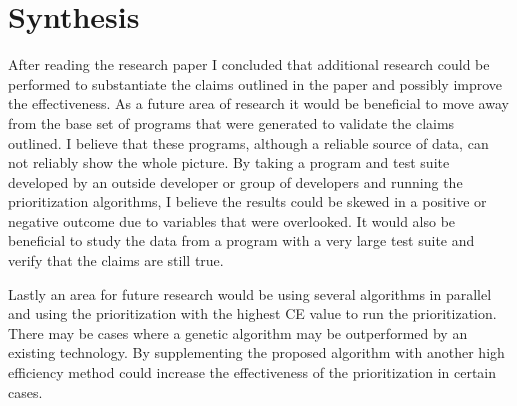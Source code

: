 \documentclass[11pt]{article}
\begin{document}
\vspace*{-.1in}
\section{Synthesis}
\label{sec:synthesis}
\vspace*{-.1in}

After reading the research paper I concluded that additional research could be performed to substantiate the claims outlined in the paper and possibly improve the effectiveness. As a future area of research it would be beneficial to move away from the base set of programs that were generated to validate the claims outlined. I believe that these programs, although a reliable source of data, can not reliably show the whole picture. By taking a program and test suite developed by an outside developer or group of developers and running the prioritization algorithms, I believe the results could be skewed in a positive or negative outcome due to variables that were overlooked. It would also be beneficial to study the data from a program with a very large test suite and verify that the claims are still true.

Lastly an area for future research would be using several algorithms in parallel and using the prioritization with the highest CE value to run the prioritization. There may be cases where a genetic algorithm may be outperformed by an existing technology. By supplementing the proposed algorithm with another high efficiency method could increase the effectiveness of the prioritization in certain cases.



\end{document}
